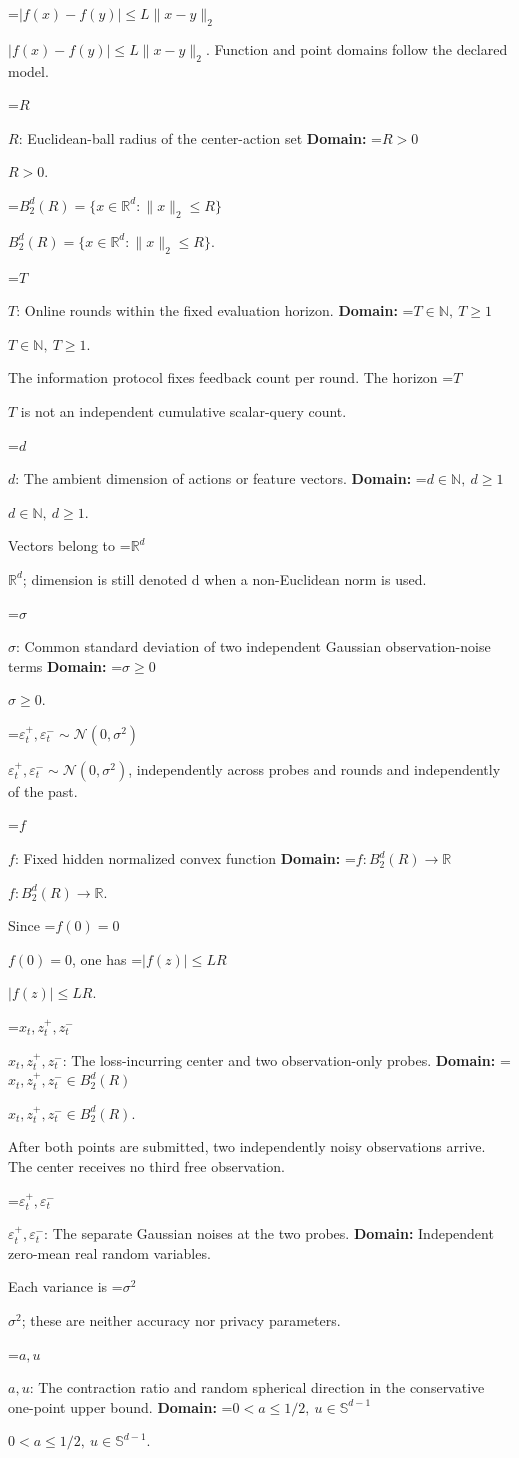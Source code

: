 \documentclass[10pt,a4paper]{article}
\newcommand{\AtlasMath}[1]{\par\begingroup\centering\setbox0=\hbox{$\displaystyle #1$}\ifdim\wd0>1.4\linewidth\typeout{ATLAS WIDE FORMULA: \the\wd0}\fi\ifdim\wd0>\linewidth\resizebox{\linewidth}{!}{\box0}\else\box0\fi\par\endgroup}
\newcommand{\AtlasInlineMath}[1]{\begingroup\setbox0=\hbox{$#1$}\ifdim\wd0>.4\linewidth\endgroup\AtlasMath{#1}\else\endgroup$#1$\fi}
\begin{document}
\AtlasInlineMath{|f(x)-f(y)|\le L\|x-y\|_2}. Function and point domains follow the declared model.

\AtlasInlineMath{R}: Euclidean-ball radius of the center-action set \textbf{Domain:} \AtlasInlineMath{R>0}.

\AtlasInlineMath{B_2^d(R)=\{x\in\mathbb R^d:\|x\|_2\le R\}}.

\AtlasInlineMath{T}: Online rounds within the fixed evaluation horizon. \textbf{Domain:} \AtlasInlineMath{T\in\mathbb N,\ T\ge1}.

The information protocol fixes feedback count per round. The horizon \AtlasInlineMath{T} is not an independent cumulative scalar-query count.

\AtlasInlineMath{d}: The ambient dimension of actions or feature vectors. \textbf{Domain:} \AtlasInlineMath{d\in\mathbb N,\ d\ge1}.

Vectors belong to \AtlasInlineMath{\mathbb R^d}; dimension is still denoted d when a non-Euclidean norm is used.

\AtlasInlineMath{\sigma}: Common standard deviation of two independent Gaussian observation-noise terms \textbf{Domain:} \AtlasInlineMath{\sigma\ge0}.

\AtlasInlineMath{\varepsilon_t^+,\varepsilon_t^-\sim\mathcal N(0,\sigma^2)}, independently across probes and rounds and independently of the past.

\AtlasInlineMath{f}: Fixed hidden normalized convex function \textbf{Domain:} \AtlasInlineMath{f:B_2^d(R)\to\mathbb R}.

Since \AtlasInlineMath{f(0)=0}, one has \AtlasInlineMath{|f(z)|\le LR}.

\AtlasInlineMath{x_t,z_t^+,z_t^-}: The loss-incurring center and two observation-only probes. \textbf{Domain:} \AtlasInlineMath{x_t,z_t^+,z_t^-\in B_2^d(R)}.

After both points are submitted, two independently noisy observations arrive. The center receives no third free observation.

\AtlasInlineMath{\varepsilon_t^+,\varepsilon_t^-}: The separate Gaussian noises at the two probes. \textbf{Domain:} Independent zero-mean real random variables.

Each variance is \AtlasInlineMath{\sigma^2}; these are neither accuracy nor privacy parameters.

\AtlasInlineMath{a,u}: The contraction ratio and random spherical direction in the conservative one-point upper bound. \textbf{Domain:} \AtlasInlineMath{0<a\le1/2,\ u\in\mathbb S^{d-1}}.
\end{document}
